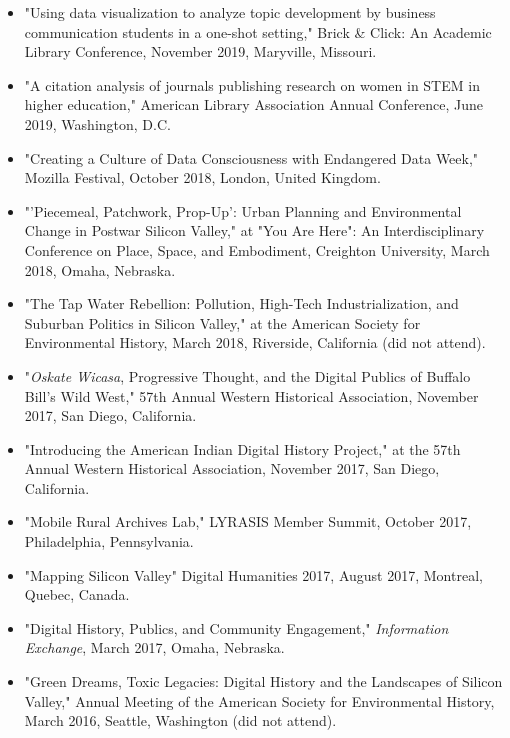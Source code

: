 \documentclass[10pt]{article}
\begin{document}
\begin{itemize}
  \item "Using data visualization to analyze topic development by business communication students in a one-shot setting," Brick \& Click: An Academic Library Conference, November 2019, Maryville, Missouri.
  
  \item "A citation analysis of journals publishing research on women in STEM in higher education," American Library Association Annual Conference, June 2019, Washington, D.C.
  
  \item "Creating a Culture of Data Consciousness with Endangered Data Week," Mozilla Festival, October 2018, London, United Kingdom.
  
  \item "'Piecemeal, Patchwork, Prop-Up': Urban Planning and Environmental Change in Postwar Silicon Valley," at "You Are Here": An Interdisciplinary Conference on Place, Space, and Embodiment, Creighton University, March 2018, Omaha, Nebraska.
  
  \item "The Tap Water Rebellion: Pollution, High-Tech Industrialization, and Suburban Politics in Silicon Valley," at the American Society for Environmental History, March 2018, Riverside, California (did not attend).
  
  \item "\textit{Oskate Wicasa}, Progressive Thought, and the Digital Publics of Buffalo Bill's Wild West," 57th Annual Western Historical Association, November 2017, San Diego, California.
  
  \item "Introducing the American Indian Digital History Project," at the 57th Annual Western Historical Association, November 2017, San Diego, California.
  
  \item "Mobile Rural Archives Lab," LYRASIS Member Summit, October 2017, Philadelphia, Pennsylvania.
  
  \item "Mapping Silicon Valley" Digital Humanities 2017, August 2017, Montreal, Quebec, Canada.
  
  \item "Digital History, Publics, and Community Engagement," \textit{Information Exchange}, March 2017, Omaha, Nebraska.
  
  \item "Green Dreams, Toxic Legacies: Digital History and the Landscapes of Silicon Valley," Annual Meeting of the American Society for Environmental History, March 2016, Seattle, Washington (did not attend).
  

\end{itemize}
\end{document}
